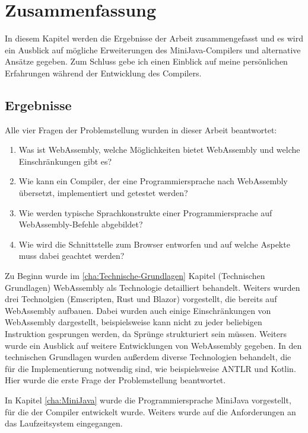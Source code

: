 \chapter{Zusammenfassung}

In diesem Kapitel werden die Ergebnisse der Arbeit zusammengefasst und es wird ein Ausblick auf mögliche Erweiterungen des MiniJava-Compilers und alternative Ansätze gegeben. Zum Schluss gebe ich einen Einblick auf meine persönlichen Erfahrungen während der Entwicklung des Compilers.

\section{Ergebnisse}

Alle vier Fragen der Problemstellung wurden in dieser Arbeit beantwortet:
\begin{enumerate}
	\item Was ist WebAssembly, welche Möglichkeiten bietet WebAssembly und welche Einschränkungen gibt es?
	\item Wie kann ein Compiler, der eine Programmiersprache nach WebAssembly übersetzt, implementiert und getestet werden?
	\item Wie werden typische Sprachkonstrukte einer Programmiersprache auf Web\-Assem\-bly-Befehle abgebildet?
	\item Wie wird die Schnittstelle zum Browser entworfen und auf welche Aspekte muss dabei geachtet werden?
\end{enumerate}

Zu Beginn wurde im \ref{cha:Technische-Grundlagen} Kapitel (Technischen Grundlagen) WebAssembly als Technologie detailliert behandelt. Weiters wurden drei Technolgien (Emscripten, Rust und Blazor) vorgestellt, die bereits auf WebAssembly aufbauen. Dabei wurden auch einige Einschränkungen von WebAssembly dargestellt, beispielsweise kann nicht zu jeder beliebigen Instruktion gesprungen werden, da Sprünge strukturiert sein müssen. Weiters wurde ein Ausblick auf weitere Entwicklungen von WebAssembly gegeben. In den technischen Grundlagen wurden außerdem diverse Technologien behandelt, die für die Implementierung notwendig sind, wie beispielsweise ANTLR und Kotlin. Hier wurde die erste Frage der Problemstellung beantwortet.

In Kapitel \ref{cha:MiniJava} wurde die Programmiersprache MiniJava vorgestellt, für die der Compiler entwickelt wurde. Weiters wurde auf die Anforderungen an das Laufzeitsystem eingegangen.

